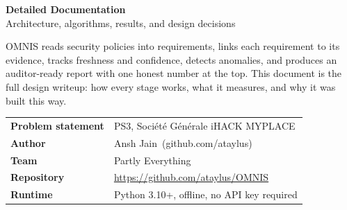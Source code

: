 \documentclass[11pt]{article}
\newcommand{\authorname}{Ansh Jain}
\newcommand{\authorhandle}{github.com/ataylus}
\begin{document}
\begin{titlepage}
\thispagestyle{empty}

\vspace*{5.9cm}

{\sffamily\bfseries\LARGE\color{navy} Detailed Documentation}\\[0.3em]
{\large Architecture, algorithms, results, and design decisions}

\vspace{0.9cm}

\noindent OMNIS reads security policies into requirements, links each requirement to
its evidence, tracks freshness and confidence, detects anomalies, and produces an
auditor-ready report with one honest number at the top. This document is the full
design writeup: how every stage works, what it measures, and why it was built this way.

\vspace{0.9cm}

\begin{tabular}{@{}p{3.6cm}l@{}}
\textbf{Problem statement} & PS3, Soci\'et\'e G\'en\'erale iHACK MYPLACE \\[3pt]
\textbf{Author} & \authorname\ (\authorhandle) \\[3pt]
\textbf{Team} & Partly Everything \\[3pt]
\textbf{Repository} & \url{https://github.com/ataylus/OMNIS} \\[3pt]
\textbf{Runtime} & Python 3.10+, offline, no API key required \\
\end{tabular}

\vspace{0.9cm}


\end{titlepage}
\end{document}
